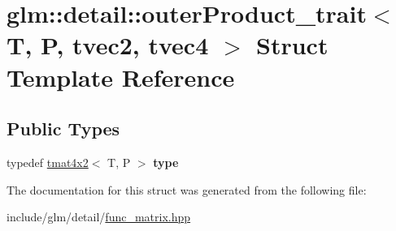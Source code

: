 \hypertarget{structglm_1_1detail_1_1outerProduct__trait_3_01T_00_01P_00_01tvec2_00_01tvec4_01_4}{}\section{glm\+:\+:detail\+:\+:outer\+Product\+\_\+trait$<$ T, P, tvec2, tvec4 $>$ Struct Template Reference}
\label{structglm_1_1detail_1_1outerProduct__trait_3_01T_00_01P_00_01tvec2_00_01tvec4_01_4}
\subsection*{Public Types}
\begin{DoxyCompactItemize}
\item 
\mbox{\label{structglm_1_1detail_1_1outerProduct__trait_3_01T_00_01P_00_01tvec2_00_01tvec4_01_4_a09deeaa6aef1fc2c29aa2e0650ba750b}} 
typedef \hyperlink{structglm_1_1tmat4x2}{tmat4x2}$<$ T, P $>$ {\bfseries type}
\end{DoxyCompactItemize}


The documentation for this struct was generated from the following file\+:\begin{DoxyCompactItemize}
\item 
include/glm/detail/\hyperlink{func__matrix_8hpp}{func\+\_\+matrix.\+hpp}\end{DoxyCompactItemize}
